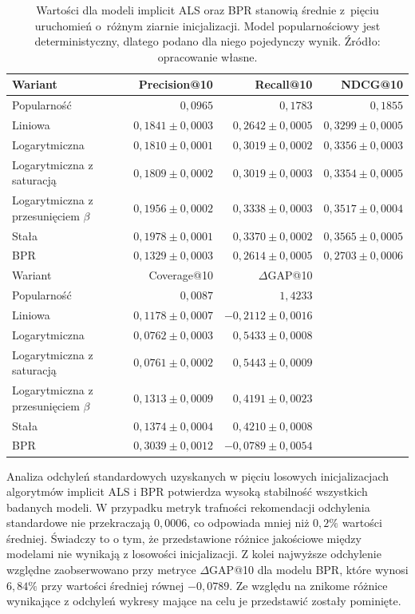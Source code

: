 \begin{table}[htbp]
\centering
\caption{Wyniki na zbiorze testowym wraz z~odchyleniami standardowymi w~pięciu uruchomieniach}
\label{tab:stabilnosc-zbiorcza}
\begin{tabular}{lrrr}
\toprule
Wariant & Precision@10 & Recall@10 & NDCG@10 \\
\midrule
Popularność & $0{,}0965$ & $0{,}1783$ & $0{,}1855$ \\
Liniowa & $0{,}1841\pm0{,}0003$ & $0{,}2642\pm0{,}0005$ & $0{,}3299\pm0{,}0005$ \\
Logarytmiczna & $0{,}1810\pm0{,}0001$ & $0{,}3019\pm0{,}0002$ & $0{,}3356\pm0{,}0003$ \\
Logarytmiczna z saturacją & $0{,}1809\pm0{,}0002$ & $0{,}3019\pm0{,}0003$ & $0{,}3354\pm0{,}0005$ \\
Logarytmiczna z przesunięciem $\beta$ & $0{,}1956\pm0{,}0002$ & $0{,}3338\pm0{,}0003$ & $0{,}3517\pm0{,}0004$ \\
Stała & $0{,}1978\pm0{,}0001$ & $0{,}3370\pm0{,}0002$ & $0{,}3565\pm0{,}0005$ \\
BPR & $0{,}1329\pm0{,}0003$ & $0{,}2614\pm0{,}0005$ & $0{,}2703\pm0{,}0006$ \\
\midrule
Wariant & Coverage@10 & $\Delta$GAP@10 & \\
\midrule
Popularność & $0{,}0087$ & $1{,}4233$ & \\
Liniowa & $0{,}1178\pm0{,}0007$ & $-0{,}2112\pm0{,}0016$ & \\
Logarytmiczna & $0{,}0762\pm0{,}0003$ & $0{,}5433\pm0{,}0008$ & \\
Logarytmiczna z saturacją & $0{,}0761\pm0{,}0002$ & $0{,}5443\pm0{,}0009$ & \\
Logarytmiczna z przesunięciem $\beta$ & $0{,}1313\pm0{,}0009$ & $0{,}4191\pm0{,}0023$ & \\
Stała & $0{,}1374\pm0{,}0004$ & $0{,}4210\pm0{,}0008$ & \\
BPR & $0{,}3039\pm0{,}0012$ & $-0{,}0789\pm0{,}0054$ & \\
\bottomrule
\end{tabular}
\caption*{\footnotesize Wartości dla modeli implicit ALS oraz BPR stanowią średnie z~pięciu uruchomień o~różnym ziarnie inicjalizacji. Model popularnościowy jest deterministyczny, dlatego podano dla niego pojedynczy wynik. Źródło: opracowanie własne.}
\end{table}

Analiza odchyleń standardowych uzyskanych w pięciu losowych inicjalizacjach algorytmów implicit ALS i BPR potwierdza wysoką stabilność wszystkich badanych modeli. W przypadku metryk trafności rekomendacji odchylenia standardowe nie przekraczają $0{,}0006$, co odpowiada mniej niż $0{,}2\%$ wartości średniej. Świadczy to o tym, że przedstawione różnice jakościowe między modelami nie wynikają z losowości inicjalizacji. Z kolei najwyższe odchylenie względne zaobserwowano przy metryce $\Delta$GAP@10 dla modelu BPR, które wynosi $6{,}84\%$ przy wartości średniej równej $-0{,}0789$. Ze względu na znikome różnice wynikające z odchyleń wykresy mające na celu je przedstawić zostały pominięte.

